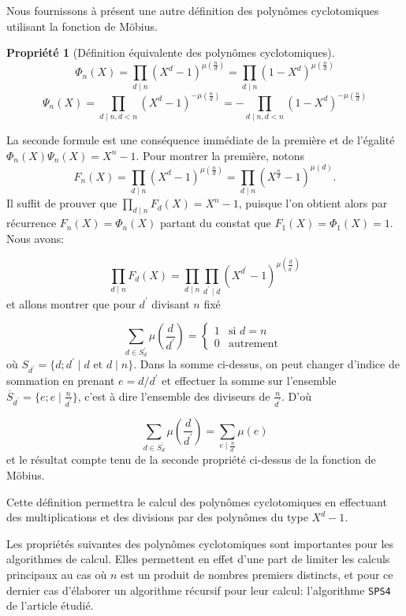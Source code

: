 \documentclass{article}
\theoremstyle{break}                  %
\newtheorem{propriete}{Propriété}
\begin{document}
Nous fournissons à présent une autre définition des polynômes cyclotomiques utilisant la fonction de Möbius.

\begin{propriete}[Définition équivalente des polynômes cyclotomiques]
	$$\Phi_n(X) = \prod_{d \mid n} (X^d - 1)^{\mu(\frac{n}{d})} = \prod_{d \mid n} (1 - X^d)^{\mu(\frac{n}{d})}$$
	$$\Psi_n(X) = \prod_{d \mid n, d<n} (X^d - 1)^{-\mu(\frac{n}{d})} = -\prod_{d \mid n, d<n} (1 - X^d)^{-\mu(\frac{n}{d})}$$
\end{propriete}

La seconde formule est une conséquence immédiate de la première et de l'égalité $\Phi_n(X) \Psi_n(X) = X^n-1$. Pour montrer la première, notons
$$F_n(X) = \prod_{d \mid n} (X^d - 1)^{\mu(\frac{n}{d})} = \prod_{d \mid n} (X^{\frac{n}{d}} - 1)^{\mu(d)}.$$ Il suffit de prouver que $\displaystyle \prod_{ d \mid n} F_d(X) = X^n-1$, puisque l'on obtient alors par récurrence $F_n(X) = \Phi_n(X)$ partant du constat que $F_1(X) = \Phi_1(X) = 1$. Nous avons:

$$\prod_{ d \mid n} F_d(X) = \prod_{ d \mid n} \prod_{d^\prime \mid d} (X^{d^\prime} - 1)^{\mu(\frac{d}{d^\prime})}$$ et allons montrer que pour $d^\prime$ divisant $n$ fixé

$$\sum_{d \in S_d^\prime} \mu\left(\frac{d}{d^\prime}\right)=\begin{cases}1 &\text{si } d= n\\
	0 &\text{autrement }\end{cases}$$ où $S_{d^\prime} = \{d ; d^\prime \mid d \text{ et } d \mid n\}$.
Dans la somme ci-dessus, on peut changer d'indice de sommation en prenant $e = d/d^\prime$ et effectuer la somme sur l'ensemble $\overline{S}_{d^\prime} = \{e ; e \mid \frac{n}{d^\prime}\}$, c'est à dire l'ensemble des diviseurs de $\frac{n}{d^\prime}$. D'où

$$\sum_{d \in S_d^\prime} \mu\left(\frac{d}{d^\prime}\right) = \sum_{e \mid \frac{n}{d^\prime}} \mu(e)$$ et le résultat compte tenu de la seconde propriété ci-dessus de la fonction de Möbius.

Cette définition permettra le calcul des polynômes cyclotomiques en effectuant des multiplications et des divisions par des polynômes du type $X^d - 1$.

Les propriétés suivantes des polynômes cyclotomiques sont importantes pour les algorithmes de calcul. Elles permettent en effet d'une part de limiter les calculs principaux au cas où $n$ est un produit de nombres premiers distincts, et pour ce dernier cas d'élaborer un algorithme récursif pour leur calcul: l'algorithme \texttt{SPS4} de l'article étudié.
\end{document}
